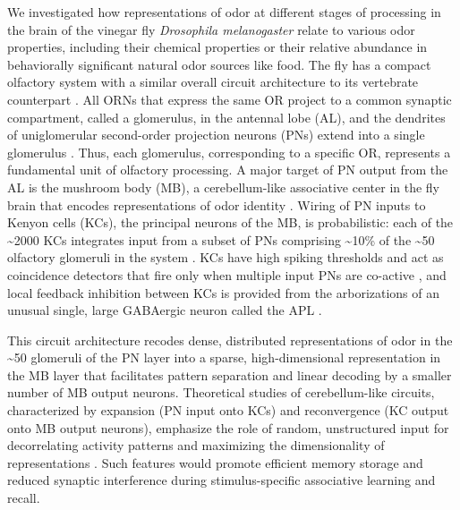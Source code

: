 \documentclass[12pt]{caltech_thesis}
\renewcommand{\cite}{{ }\autocite}
\begin{document}
\begin{refsection}
We investigated how representations of odor at different stages of processing in the brain of the vinegar fly \textit{Drosophila melanogaster} relate to various odor properties, including their chemical properties or their relative abundance in behaviorally significant natural odor sources like food. 
The fly has a compact olfactory system with a similar overall circuit architecture to its vertebrate counterpart\cite{EarlyOlfReview}.
All ORNs that express the same OR project to a common synaptic compartment, called a glomerulus, in the antennal lobe (AL), and the dendrites of uniglomerular second-order projection neurons (PNs) extend into a single glomerulus\cite{MolecularArchOfSmellReview}.
Thus, each glomerulus, corresponding to a specific OR, represents a fundamental unit of olfactory processing.
A major target of PN output from the AL is the mushroom body (MB), a cerebellum-like associative center in the fly brain that encodes representations of odor identity\cite{MBArchToAlgReview}.
Wiring of PN inputs to Kenyon cells (KCs), the principal neurons of the MB, is probabilistic: each of the \textasciitilde2000 KCs integrates input from a subset of PNs comprising \textasciitilde10\% of the \textasciitilde50 olfactory glomeruli in the system\cite{Caron2013,MBConnectomeInsights,CommunityPNs}.
KCs have high spiking thresholds and act as coincidence detectors that fire only when multiple input PNs are co-active\cite{KCSpiking,Gruntman2013}, and local feedback inhibition between KCs is provided from the arborizations of an unusual single, large GABAergic neuron called the APL\cite{Lin2014}.

This circuit architecture recodes dense, distributed representations of odor in the \textasciitilde50 glomeruli of the PN layer into a sparse, high-dimensional representation in the MB layer\cite{Endo2020,Honegger2011,Campbell2013,Bhandawat2007} that facilitates pattern separation and linear decoding by a smaller number of MB output neurons.
Theoretical studies of cerebellum-like circuits, characterized by expansion (PN input onto KCs) and reconvergence (KC output onto MB output neurons), emphasize the role of random, unstructured input for decorrelating activity patterns and maximizing the dimensionality of representations\cite{PatternSeparationMechanisms,OptimalConnectivityDegree}.
Such features would promote efficient memory storage and reduced synaptic interference during stimulus-specific associative learning and recall.


\end{refsection}
\end{document}
